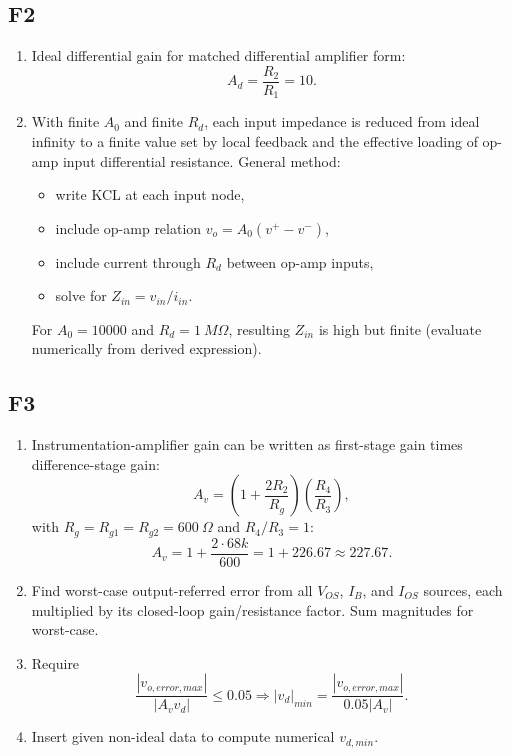 \documentclass[12pt,a4paper]{article}
\begin{document}
\subsection{F2}
\begin{enumerate}
\item Ideal differential gain for matched differential amplifier form:
\[
A_d=\frac{R_2}{R_1}=10.
\]
\item With finite $A_0$ and finite $R_d$, each input impedance is reduced from ideal infinity to a finite value set by local feedback and the effective loading of op-amp input differential resistance.
General method:
\begin{itemize}
\item write KCL at each input node,
\item include op-amp relation $v_o=A_0(v^+-v^-)$,
\item include current through $R_d$ between op-amp inputs,
\item solve for $Z_{in}=v_{in}/i_{in}$.
\end{itemize}
For $A_0=\num{10000}$ and $R_d=\SI{1}{M\Omega}$, resulting $Z_{in}$ is high but finite (evaluate numerically from derived expression).
\end{enumerate}

\subsection{F3}
\begin{enumerate}
\item Instrumentation-amplifier gain can be written as first-stage gain times difference-stage gain:
\[
A_v=\left(1+\frac{2R_2}{R_g}\right)\left(\frac{R_4}{R_3}\right),
\]
with $R_g=R_{g1}=R_{g2}=\SI{600}{\Omega}$ and $R_4/R_3=1$:
\[
A_v=1+\frac{2\cdot68k}{600}=1+226.67\approx227.67.
\]
\item Find worst-case output-referred error from all $V_{OS}$, $I_B$, and $I_{OS}$ sources, each multiplied by its closed-loop gain/resistance factor. Sum magnitudes for worst-case.
\item Require
\[
\frac{|v_{o,error,max}|}{|A_v v_d|}\le0.05
\Rightarrow
|v_d|_{min}=\frac{|v_{o,error,max}|}{0.05|A_v|}.
\]
\item Insert given non-ideal data to compute numerical $v_{d,min}$.
\end{enumerate}
\end{document}
